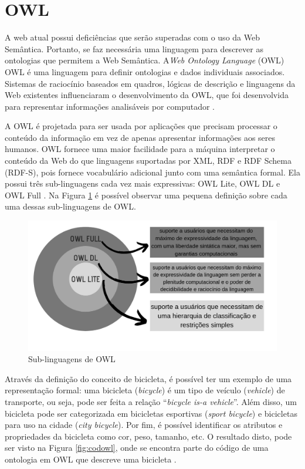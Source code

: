 \documentclass{bcc}
\begin{document}
\section{OWL}

A web atual possui deficiências que serão superadas com o uso da Web Semântica. Portanto, se faz necessária uma linguagem para descrever as ontologias que permitem a Web Semântica. A\textit{Web Ontology Language} (OWL) OWL é uma linguagem para definir ontologias e dados individuais associados. Sistemas de raciocínio baseados em quadros, lógicas de descrição e linguagens da Web existentes influenciaram o desenvolvimento da OWL, que foi desenvolvida para representar informações analisáveis por computador \cite{lacy2005}.

A OWL é projetada para ser usada por aplicações que precisam processar o conteúdo da informação em vez de apenas apresentar informações aos seres humanos. OWL fornece uma maior facilidade para a máquina interpretar o conteúdo da Web do que linguagens suportadas por XML, RDF e RDF Schema (RDF-S), pois fornece vocabulário adicional junto com uma semântica formal. Ela possui três sub-linguagens cada vez mais expressivas: OWL Lite, OWL DL e OWL Full \cite{mcguinness}. Na Figura \ref{fig:owlsub} é possível observar uma pequena definição sobre cada uma dessas sub-linguagens de OWL.

\begin{figure}[H]
\centering
\includegraphics[width=.9\textwidth]{Figuras/owl_sub.png}
\caption{Sub-linguagens de OWL}
\label{fig:owlsub}
\end{figure}

Através da definição do conceito de bicicleta, é possível ter um exemplo de uma representação formal: uma bicicleta (\textit{bicycle}) é um tipo de veículo (\textit{vehicle}) de transporte, ou seja, pode ser feita a relação “\textit{bicycle is-a vehicle}”. Além disso, um bicicleta pode ser categorizada em bicicletas esportivas (\textit{sport bicycle}) e bicicletas para uso na cidade (\textit{city bicycle}). Por fim, é possível identificar os atributos e propriedades da bicicleta como cor, peso, tamanho, etc. O resultado disto, pode ser visto na Figura \ref{fig:codowl}, onde se encontra parte do código de uma ontologia em OWL que descreve uma bicicleta \cite{isotani2015}.
\end{document}

